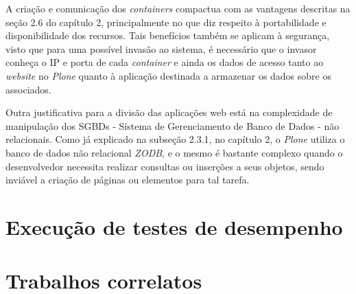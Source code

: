 A criação e comunicação dos \textit{containers} compactua com as vantagens descritas na seção 2.6 do capítulo 2, principalmente no que diz respeito à portabilidade e disponibilidade dos recursos. Tais benefícios também se aplicam à segurança, visto que para uma possível invasão ao sistema, é necessário que o invasor conheça o IP e porta de cada \textit{container} e ainda os dados de acesso tanto ao \textit{website} no \textit{Plone} quanto à aplicação destinada a armazenar os dados sobre os associados.   

Outra justificativa para a divisão das aplicações web está na complexidade de manipulação dos SGBDs - Sistema de Gerenciamento de Banco de Dados - não relacionais. Como já explicado na subseção 2.3.1, no capítulo 2, o \textit{Plone} utiliza o banco de dados não relacional \textit{ZODB}, e o mesmo é bastante complexo quando o desenvolvedor necessita realizar consultas ou inserções a seus objetos, sendo inviável a criação de páginas ou elementos para tal tarefa.  

\hspace{2.5cm}
\section{Execução de testes de desempenho}
\label{sec:testes}
\hspace{2.5cm}

\hspace{2.5cm}
\section{Trabalhos correlatos}
\hspace{2.5cm}
